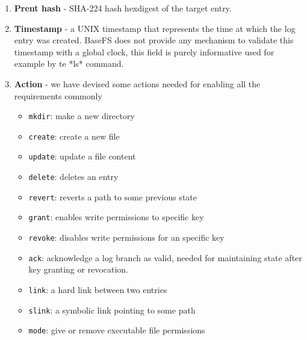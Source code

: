 \documentclass{sig-alternate}
\begin{document}
\begin{enumerate}
\item \textbf{Prent hash} - SHA-224 hash hexdigest of the target entry. 
\item \textbf{Timestamp} - a UNIX timestamp that represents the time at which the log entry was created. BaseFS does not provide any mechanism to validate this timestamp with a global clock, this field is purely informative used for example by te *ls* command.
\item \textbf{Action} - we have devised some actions needed for enabling all the requirements commonly
    \begin{itemize}
    \item \texttt{mkdir}: make a new directory
    \item \texttt{create}: create a new file
    \item \texttt{update}: update a file content
    \item \texttt{delete}: deletes an entry
    \item \texttt{revert}: reverts a path to some previous state
    \item \texttt{grant}: enables write permissions to specific key
    \item \texttt{revoke}: disables write permissions for an specific key
    \item \texttt{ack}: acknowledge a log branch as valid, needed for maintaining state after key granting or revocation.
    \item \texttt{link}: a hard link between two entries
    \item \texttt{slink}: a symbolic link pointing to some path
    \item \texttt{mode}: give or remove executable file permissions
    \end{itemize}


\end{enumerate}
\end{document}
